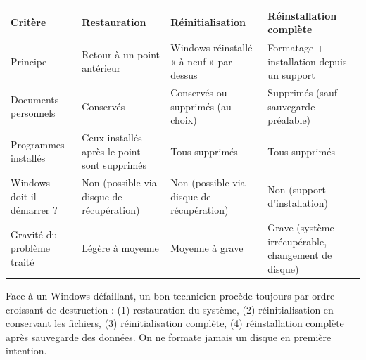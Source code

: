 \documentclass[11pt]{article}
\begin{document}
\begin{center}
\begin{tabularx}{\linewidth}{|l|X|X|X|}
\hline
\rowcolor{popblueL} \textbf{Critère} & \textbf{Restauration} & \textbf{Réinitialisation} & \textbf{Réinstallation complète} \\
\hline
Principe & Retour à un point antérieur & Windows réinstallé « à neuf » par-dessus & Formatage + installation depuis un support \\
\hline
Documents personnels & Conservés & Conservés ou supprimés (au choix) & Supprimés (sauf sauvegarde préalable) \\
\hline
Programmes installés & Ceux installés après le point sont supprimés & Tous supprimés & Tous supprimés \\
\hline
Windows doit-il démarrer ? & Non (possible via disque de récupération) & Non (possible via disque de récupération) & Non (support d'installation) \\
\hline
Gravité du problème traité & Légère à moyenne & Moyenne à grave & Grave (système irrécupérable, changement de disque) \\
\hline
\end{tabularx}
\end{center}

\begin{aretenir}
Face à un Windows défaillant, un bon technicien procède toujours par ordre croissant de destruction : (1) restauration du système, (2) réinitialisation en conservant les fichiers, (3) réinitialisation complète, (4) réinstallation complète après sauvegarde des données. On ne formate jamais un disque en première intention.
\end{aretenir}
\end{document}
